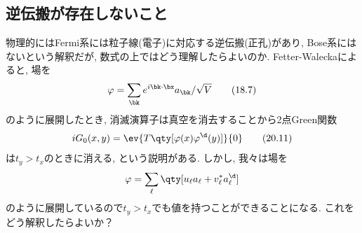 \documentclass[10.5pt,a4paper]{jreport}
\begin{document}
\subsection{逆伝搬が存在しないこと}
物理的にはFermi系には粒子線(電子)に対応する逆伝搬(正孔)があり, Bose系にはないという解釈だが, 数式の上ではどう理解したらよいのか. Fetter-Waleckaによると, 場を
\begin{equation}
  \varphi = \sum_{\bk} e^{i\bk\cdot\bx }a_{\bk}/\sqrt{V}\tag{18.7}
\end{equation}
のように展開したとき, 消滅演算子は真空を消去することから2点Green関数
\begin{equation}
  iG_0(x, y) =  \ev{T\qty[\varphi(x)\varphi^\d(y)]}{0}\tag{20.11}
\end{equation}
は$t_y>t_x$のときに消える, という説明がある. しかし, 我々は場を
\begin{eqnarray}
  \varphi = \sum_\ell \qty[u_\ell a_\ell + v_\ell^*a^\d_\ell]
\end{eqnarray}
のように展開しているので$t_y>t_x$でも値を持つことができることになる. これをどう解釈したらよいか？
\newpage
\end{document}
